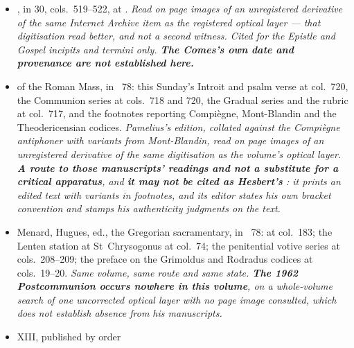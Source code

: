 \begin{itemize}[leftmargin=1.2em, itemsep=0.15em]
surrounding Sundays. \textit{Read on page images of the registered artifact,
its digest matched before reading. Cited for the ancient title , for the St~Lawrence cycle and its varying count, for the chants'
Lenten cross-references, and for his comment on all three orations. His English
paraphrases are not text witnesses and the appointed Latin is nowhere taken
from him. \textbf{Four absences on those pages are reported above as absences:
no station, no sacramentary siglum, no manuscript citation, and no note that
the Communion is secondary.}}
\item {}, in  30, cols.~519--522, at
. \textit{Read on page images of an
unregistered derivative of the same Internet Archive item as the registered
optical layer --- that digitisation read better, and not a second witness.
Cited for the Epistle and Gospel incipits and termini only. \textbf{The Comes's
own date and provenance are not established here.}}
\item {} of the Roman Mass, in ~78: this Sunday's Introit and psalm verse at col.~720, the Communion
series at cols.~718 and 720, the Gradual series and the  rubric at col.~717, and the footnotes reporting Compiègne,
Mont-Blandin and the Theodericensian codices. \textit{Pamelius's edition,
collated against the Compiègne antiphoner with variants from Mont-Blandin,
read on page images of an unregistered derivative of the same digitisation as
the volume's optical layer. \textbf{A route to those manuscripts' readings and
not a substitute for a critical apparatus}, and \textbf{it may not be cited as
Hesbert's }: it prints an edited text with variants in
footnotes, and its editor states his own bracket convention and stamps his
authenticity judgments on the text.}
\item Menard, Hugues, ed., the Gregorian sacramentary, in ~78:  at col.~183; the Lenten
station at St~Chrysogonus at col.~74; the penitential votive series at
cols.~208--209; the preface on the Grimoldus and Rodradus codices at
cols.~19--20. \textit{Same volume, same route and same state. \textbf{The 1962
Postcommunion occurs nowhere in this volume}, on a whole-volume search of one
uncorrected optical layer with no page image consulted, which does not establish
absence from his manuscripts.}
\item {} XIII,  published by order

\end{itemize}
